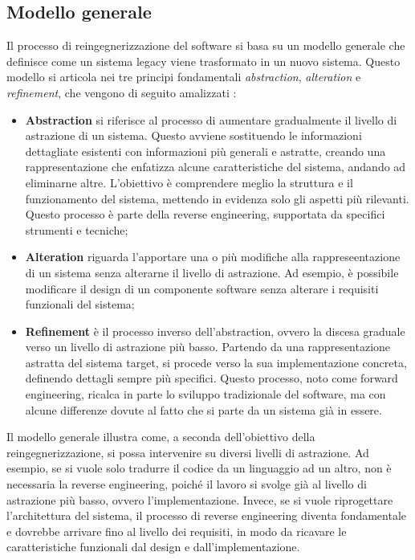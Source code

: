 \subsection{Modello generale}
Il processo di reingegnerizzazione del software si basa su un modello generale che definisce come un sistema legacy viene trasformato in un nuovo sistema. Questo modello si articola nei tre principi fondamentali \textit{abstraction}, \textit{alteration} e \textit{refinement}, che vengono di seguito amalizzati \cite{rosenberg1996software}:
\begin{itemize}
  \item \textbf{Abstraction} si riferisce al processo di aumentare gradualmente il livello di astrazione di un sistema. Questo avviene sostituendo le informazioni dettagliate esistenti con informazioni più generali e astratte, creando una rappresentazione che enfatizza alcune caratteristiche del sistema, andando ad eliminarne altre. L'obiettivo è comprendere meglio la struttura e il funzionamento del sistema, mettendo in evidenza solo gli aspetti più rilevanti. Questo processo è parte della reverse engineering, supportata da specifici strumenti e tecniche;
  \item \textbf{Alteration} riguarda l'apportare una o più modifiche alla rappreseentazione di un sistema senza alterarne il livello di astrazione. Ad esempio, è possibile modificare il design di un componente software senza alterare i requisiti funzionali del sistema;
  \item \textbf{Refinement} è il processo inverso dell'abstraction, ovvero la discesa graduale verso un livello di astrazione più basso. Partendo da una rappresentazione astratta del sistema target, si procede verso la sua implementazione concreta, definendo dettagli sempre più specifici. Questo processo, noto come forward engineering, ricalca in parte lo sviluppo tradizionale del software, ma con alcune differenze dovute al fatto che si parte da un sistema già in essere.
\end{itemize}

Il modello generale illustra come, a seconda dell'obiettivo della reingegnerizzazione, si possa intervenire su diversi livelli di astrazione. Ad esempio, se si vuole solo tradurre il codice da un linguaggio ad un altro, non è necessaria la reverse engineering, poiché il lavoro si svolge già al livello di astrazione più basso, ovvero l'implementazione. Invece, se si vuole riprogettare l'architettura del sistema, il processo di reverse engineering diventa fondamentale e dovrebbe arrivare fino al livello dei requisiti, in modo da ricavare le caratteristiche funzionali dal design e dall'implementazione.

